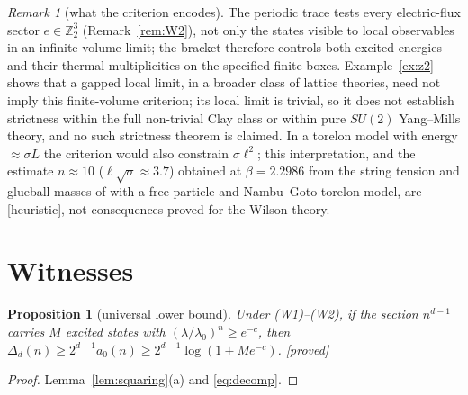 \documentclass[11pt,a4paper]{article}
\theoremstyle{plain}
\newtheorem{proposition}[theorem]{Proposition}
\theoremstyle{definition}
\theoremstyle{remark}
\newtheorem{remark}[theorem]{Remark}
\numberwithin{equation}{section}
\newcommand{\Z}{\mathbb{Z}}
\newcommand{\st}[1]{\textsf{[#1]}}
\begin{document}
\begin{remark}[what the criterion encodes]\label{rem:flux}
The periodic trace tests every electric-flux sector $e\in\Z_2^3$ (Remark~\ref{rem:W2}), not only the states visible to local observables in
an infinite-volume limit; the bracket therefore controls both excited energies and their thermal multiplicities on the specified finite
boxes. Example~\ref{ex:z2} shows that a gapped local limit, in a broader class of lattice theories, need not imply this finite-volume
criterion; its local limit is trivial, so it does not establish strictness within the full non-trivial Clay class or within pure $SU(2)$
Yang--Mills theory, and no such strictness theorem is claimed. In a torelon model with energy $\approx\sigma L$ the criterion would also constrain
$\sigma\ell^2$; this interpretation, and the estimate $n\approx10$ ($\ell\sqrt\sigma\approx3.7$) obtained at $\beta=2.2986$ from the string tension
and glueball masses of \cite{AT21} with a free-particle and Nambu--Goto torelon model, are \st{heuristic}, not consequences proved for the
Wilson theory.
\end{remark}

\section{Witnesses}\label{sec:witness}

\begin{proposition}[universal lower bound]\label{prop:lower}
Under (W1)--(W2), if the section $n^{d-1}$ carries $M$ excited states with $(\lambda/\lambda_0)^n\ge e^{-c}$, then
$\Delta_d(n)\ge2^{d-1}a_0(n)\ge2^{d-1}\log(1+Me^{-c})$. \st{proved}
\end{proposition}
\begin{proof}
Lemma~\ref{lem:squaring}(a) and \eqref{eq:decomp}.
\end{proof}
\end{document}
